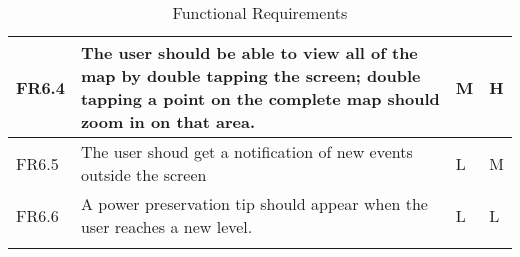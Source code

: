 \begin{longtable}{| p{1.5cm} | p{8cm} | p{1.5cm} | p{2cm} |}
   FR6.4 & The user should be able to view all of the map by double tapping the screen; double tapping a 
   point on the complete map should zoom in on that area. & M & H \\ \hline

   FR6.5 & The user shoud get a notification of new events outside the screen & L & M \\ \hline

   FR6.6 & A power preservation tip should appear when the user reaches a new level. & L & L \\ \hline

\hline
\caption{Functional Requirements}
\end{longtable}
